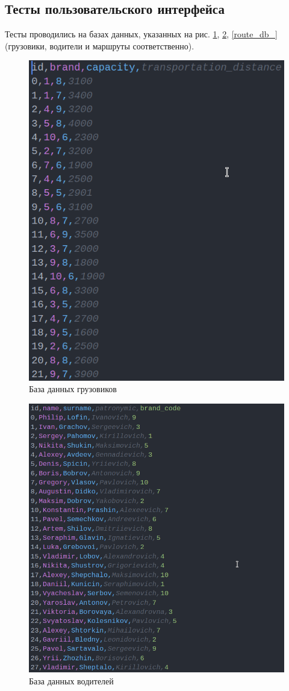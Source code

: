 \subsection{Тесты пользовательского интерфейса}

Тесты проводились на базах данных, указанных на рис. \ref{truck_db_}, \ref{driver_db_}, \ref{route_db_} (грузовики, водители и маршруты соответственно).

\begin{figure}[H]
	\centering
	\includegraphics[width=0.7\linewidth]{photo/tests/user/truck_db}
	\caption{База данных грузовиков}
	\label{truck_db_}
\end{figure}

\begin{figure}[H]
	\centering
	\includegraphics[width=0.7\linewidth]{photo/tests/user/driver_db}
	\caption{База данных водителей}
	\label{driver_db_}
\end{figure}

